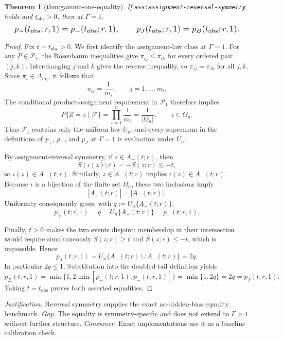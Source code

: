 \documentclass{article}
\newtheorem{theorem}{Theorem}
\begin{document}
\begin{theorem}[thm:gamma-one-equality]\label{thm:gamma-one-equality}
If \texttt{ass:assignment-reversal-symmetry} holds and \(t_{\mathrm{obs}}>0\), then at \(\Gamma=1\), \[
\makebox[\linewidth][c]{\resizebox{0.98\linewidth}{!}{\par\noindent \makebox[\linewidth][c]{\resizebox{0.98\linewidth}{!}{\(\displaystyle \displaystyle p_+(t_{\mathrm{obs}};r,1)=p_-(t_{\mathrm{obs}};r,1),\qquad p_J(t_{\mathrm{obs}};r,1)=p_B(t_{\mathrm{obs}};r,1).\)}}\par\noindent}}
\]
\end{theorem}
\begin{proof}
Fix \(t=t_{\mathrm{obs}}>0\). We first identify the assignment-law class at \(\Gamma=1\). For any \(P\in\mathcal P_1\), the Rosenbaum inequalities give \(\pi_{ij}\le\pi_{ik}\) for every ordered pair \((j,k)\). Interchanging \(j\) and \(k\) gives the reverse inequality, so \(\pi_{ij}=\pi_{ik}\) for all \(j,k\). Since \(\pi_i\in\Delta_{m_i}\), it follows that
\[
\pi_{ij}=\frac{1}{m_i},\qquad j=1,\ldots,m_i.
\]
The conditional product-assignment requirement in \(\mathcal P_1\) therefore implies
\[
P\{Z=z\mid\mathcal F\}=\prod_{i=1}^n\frac{1}{m_i}=\frac{1}{|\Omega_n|},\qquad z\in\Omega_n.
\]
Thus \(\mathcal P_1\) contains only the uniform law \(U_n\), and every supremum in the definitions of \(p_+\), \(p_-\), and \(p_J\) at \(\Gamma=1\) is evaluation under \(U_n\).

By assignment-reversal symmetry, if \(z\in A_+(t;r)\), then
\[
S(\iota(z);r)=-S(z;r)\le -t,
\]
so \(\iota(z)\in A_-(t;r)\). Similarly, \(z\in A_-(t;r)\) implies \(\iota(z)\in A_+(t;r)\). Because \(\iota\) is a bijection of the finite set \(\Omega_n\), these two inclusions imply
\[
|A_+(t;r)|=|A_-(t;r)|.
\]
Uniformity consequently gives, with \(q:=U_n\{A_+(t;r)\}\),
\[
p_+(t;r,1)=q=U_n\{A_-(t;r)\}=p_-(t;r,1).
\]

Finally, \(t>0\) makes the two events disjoint: membership in their intersection would require simultaneously \(S(z;r)\ge t\) and \(S(z;r)\le -t\), which is impossible. Hence
\[
p_J(t;r,1)=U_n\{A_+(t;r)\cup A_-(t;r)\}=2q.
\]
In particular \(2q\le1\). Substitution into the doubled-tail definition yields
\[
p_B(t;r,1)=\min\{1,2\min[p_+(t;r,1),p_-(t;r,1)]\}=\min\{1,2q\}=2q=p_J(t;r,1).
\]
Taking \(t=t_{\mathrm{obs}}\) proves both asserted equalities.
\end{proof}
\par\smallskip\noindent \textit{Justification.} Reversal symmetry supplies the exact no-hidden-bias equality benchmark. \textit{Gap.} The equality is symmetry-specific and does not extend to \(\Gamma>1\) without further structure. \textit{Consumer.} Exact implementations use it as a baseline calibration check.
\end{document}
